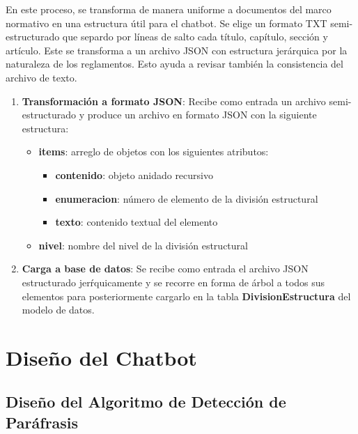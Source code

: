 En este proceso, se transforma de manera uniforme a documentos del marco normativo en una estructura útil para el chatbot. Se elige un formato TXT semi-estructurado que separdo por líneas de salto cada título, capítulo, sección y artículo. Este se transforma a un archivo JSON con estructura jerárquica por la naturaleza de los reglamentos. Esto ayuda a revisar también la consistencia del archivo de texto.

\begin{enumerate}
    \item \textbf{Transformación a formato JSON}: Recibe como entrada un archivo semi-estructurado y produce un archivo en formato JSON con la siguiente estructura:
    
    \begin{itemize}
        \item \textbf{items}: arreglo de objetos con los siguientes atributos:
        
        \begin{itemize}
            \item \textbf{contenido}: objeto anidado recursivo
            \item \textbf{enumeracion}: número de elemento de la división estructural
            \item \textbf{texto}: contenido textual del elemento
        \end{itemize}
        
        \item \textbf{nivel}: nombre del nivel de la división estructural
    \end{itemize}
    
    \item \textbf{Carga a base de datos}: Se recibe como entrada el archivo JSON estructurado jerŕquicamente y se recorre en forma de árbol a todos sus elementos para posteriormente cargarlo en la tabla \textbf{DivisionEstructura} del modelo de datos.
\end{enumerate}


%
%
%
%


\section{Diseño del Chatbot}

\subsection{Diseño del Algoritmo de Detección de Paráfrasis}

